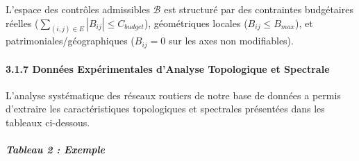 \documentclass[10pt, a4paper]{article}
\begin{document}
L'espace des contrôles admissibles \(\mathcal{B}\) est structuré par des
contraintes budgétaires réelles
(\(\sum_{(i,j) \in E} |B_{ij}| \le C_{budget}\)), géométriques locales
(\(B_{ij} \le B_{max}\)), et patrimoniales/géographiques (\(B_{ij} = 0\)
sur les axes non modifiables).

\paragraph{3.1.7 Données Expérimentales d'Analyse Topologique et
Spectrale}\label{donnuxe9es-expuxe9rimentales-danalyse-topologique-et-spectrale}

L'analyse systématique des réseaux routiers de notre base de données a
permis d'extraire les caractéristiques topologiques et spectrales
présentées dans les tableaux ci-dessous.

\subparagraph{Tableau 2 : Exemple}\label{tableau-2-exemple}
\end{document}
